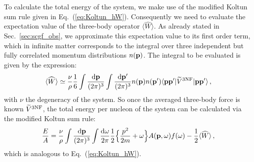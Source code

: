 To calculate the total energy of the system, we make use of the modified Koltun sum rule given in Eq.~(\ref{eq:Koltun_hW}). Consequently we need to evaluate the expectation value of the three-body operator $\langle \widehat W\rangle$. As already stated in Sec.~\ref{sec:scgf_obs}, we approximate this expectation value to its first order term, which in infinite matter corresponds to the integral over three independent but fully correlated momentum distributions $n({\bf p})$. The integral to be evaluated is given by the expression:
\begin{equation}
\langle \widehat W\rangle\simeq\frac{\nu}{\rho}\frac{1}{6}\int \frac{{\rm d}{\bf p}}{(2\pi)^3}\int\frac{{\rm d}{\bf p'}}{(2\pi)^3}n({\bf p})n({\bf p'})\langle{\bf pp'}|\widetilde V^{\rm 3NF}|{\bf pp'}\rangle\,,
\label{3B_exp}
\end{equation}
with $\nu$ the degeneracy of the system. So once the averaged three-body force is known $\widetilde V^{\rm 3NF}$, the total energy per nucleon of the system can be calculated via the modified Koltun sum rule:
\begin{equation}
\frac{E}{A}=\frac{\nu}{\rho}\int\frac{{\rm d}{\bf p}}{(2\pi)^3}\int\frac{{\rm d}\omega}{2\pi}\frac{1}{2}\Big\{\frac{p^2}{2m}+\omega\Big\}A({\bf p},\omega)f(\omega)-\frac{1}{2}\langle \widehat W\rangle\,,
\end{equation}
which is analogous to Eq.~(\ref{eq:Koltun_hW}).


